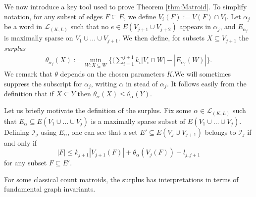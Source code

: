 \documentclass{article}
\begin{document}



We now introduce a key tool used to prove Theorem \ref{thm:Matroid}.  To simplify notation,
for any subset of edges $F\subseteq E$, we define $V_i(F):=V(F)\cap V_i$.
Let $\alpha_j$ be a word in $\mathcal{L}_{(K,L)}$ such that no $e\in E(V_{j+1} \cup V_{j+2})$ appears in $\alpha_j$, and $E_{\alpha_j}$ is maximally sparse on $V_1 \cup \dots \cup V_{j+1}$. We then define, for subsets $X\subseteq V_{j+1}$ the \textit{surplus}
\begin{align*}
    \theta_{\alpha_j}(X) := \min_{W: X\subseteq W}\{(\sum_{i=1}^{j+1} k_{i}|V_{i} \cap W| - |E_{\alpha_j}(W)|\}.
\end{align*} 
We remark that $\theta$ depends on the chosen parameters $K$.We will sometimes suppress the subscript for $\alpha_j$, writing $\alpha$ in stead of $\alpha_j.$ It follows easily from the definition that if $X\subseteq Y$ then $\theta_{\alpha}(X) \leq \theta_{\alpha}(Y)$. 


Let us briefly motivate the definition of the surplus.
Fix some $\alpha \in \mathcal{L}_{(K,L)}$ such that $E_{\alpha} \subseteq E(V_1 \cup \dots \cup V_j)$ is a maximally sparse subset of $ E(V_1\cup \dots \cup V_j)$. Defining $\mathcal{I}_j$ using $E_{\alpha}$, one can see that a set $E'\subseteq E(V_j\cup V_{j+1})$ belongs to $\mathcal{I}_j$ if and only if
\begin{equation}
    |F|\leq k_{j+1}|V_{j+1}(F)| + \theta_{\alpha}(V_{j}(F)) - l_{j,j+1}
    \label{def:matroid}
\end{equation}
for any subset $F \subseteq E'$.  

For some classical count matroids, the surplus has interpretations in terms of fundamental graph invariants.
\end{document}
